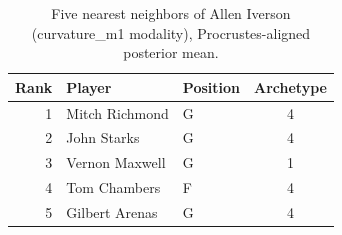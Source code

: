 \begin{table}[htbp]
  \centering\small
  \begin{tabular}{rllc}
    \toprule
    Rank & Player & Position & Archetype \\
    \midrule
    1 & Mitch Richmond & G & 4 \\
    2 & John Starks & G & 4 \\
    3 & Vernon Maxwell & G & 1 \\
    4 & Tom Chambers & F & 4 \\
    5 & Gilbert Arenas & G & 4 \\
    \bottomrule
  \end{tabular}
  \caption{Five nearest neighbors of Allen Iverson (curvature_m1 modality), Procrustes-aligned posterior mean.}
  \label{tab:Allen_Iverson_neighbors_curvature_m1}
\end{table}

